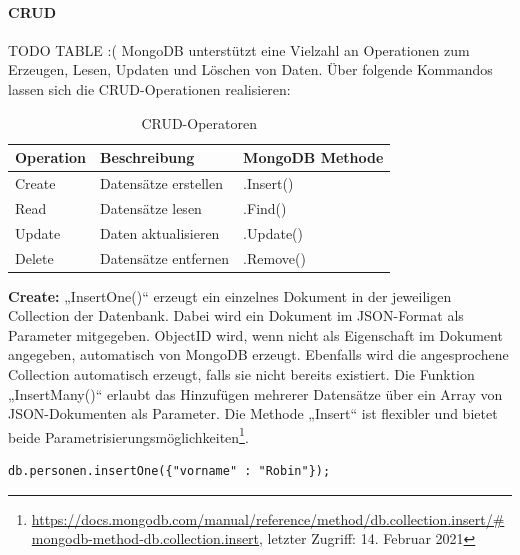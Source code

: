 \paragraph{CRUD} TODO TABLE :(
MongoDB unterstützt eine Vielzahl an Operationen zum Erzeugen, Lesen, Updaten und Löschen von Daten.
Über folgende Kommandos lassen sich die CRUD-Operationen realisieren:
\newline

\begin{table}[tbt]
\caption{CRUD-Operatoren}
\begin{center}
    \begin{tabular}{ l  p{8cm}  l }
    \toprule
    \textbf{Operation} & \textbf{Beschreibung} & \textbf{MongoDB Methode} \\
    \midrule

    Create & Datensätze erstellen & .Insert() \\

	Read & Datensätze lesen & .Find() \\

    Update & Daten aktualisieren & .Update() \\ 

    Delete & Datensätze entfernen & .Remove()  \\ 
    \bottomrule
    \end{tabular}
\end{center}
\end{table}

\noindent
{}
\textbf{Create:}
„InsertOne()“ erzeugt ein einzelnes Dokument in der jeweiligen Collection der Datenbank. Dabei wird ein Dokument im JSON-Format als Parameter mitgegeben. ObjectID wird, wenn nicht als Eigenschaft im Dokument angegeben, automatisch von MongoDB erzeugt. Ebenfalls wird die angesprochene Collection automatisch erzeugt, falls sie nicht bereits existiert. Die Funktion „InsertMany()“  erlaubt das Hinzufügen mehrerer Datensätze über ein Array von JSON-Dokumenten als Parameter. Die Methode „Insert“ ist flexibler und bietet beide Parametrisierungsmöglichkeiten\footnote{\url{https://docs.mongodb.com/manual/reference/method/db.collection.insert/\#mongodb-method-db.collection.insert}, letzter Zugriff: 14. Februar 2021}.
\newline
\begin{lstlisting}[caption=MongoDB Create, label=lst:MongoDBCreate]
db.personen.insertOne({"vorname" : "Robin"});
\end{lstlisting}

